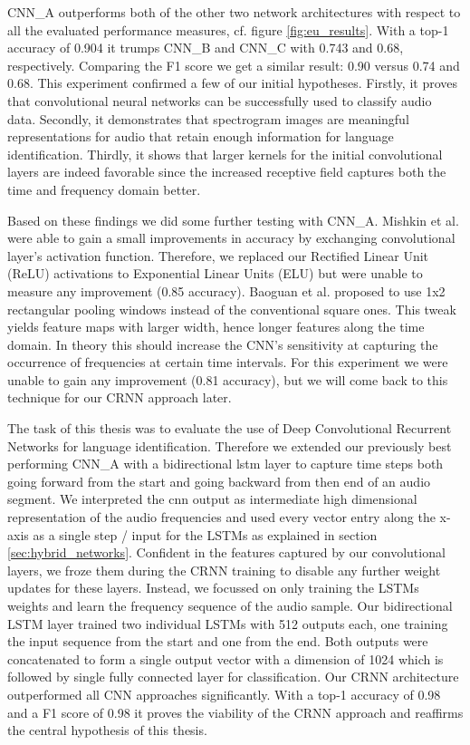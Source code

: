 CNN\_A outperforms both of the other two network architectures with respect to all the evaluated performance measures, cf. figure \ref{fig:eu_results}. With a top-1 accuracy of 0.904 it trumps CNN\_B and CNN\_C with 0.743 and 0.68, respectively. Comparing the F1 score we get a similar result: 0.90 versus 0.74 and 0.68. This experiment confirmed a few of our initial hypotheses. Firstly, it proves that convolutional neural networks can be successfully used to classify audio data. Secondly, it demonstrates that spectrogram images are meaningful representations for audio that retain enough information for language identification. Thirdly, it shows that larger kernels for the initial convolutional layers are indeed favorable since the increased receptive field captures both the time and frequency domain better. 

Based on these findings we did some further testing with CNN\_A. Mishkin et al.\cite{mishkin2016systematic} were able to gain a small improvements in accuracy by exchanging convolutional layer's activation function. Therefore, we replaced our  Rectified Linear Unit (ReLU) activations to Exponential Linear Units\cite{clevert2015fast} (ELU) but were unable to measure any improvement (0.85 accuracy). 
Baoguan et al. \cite{shi2016end} proposed to use 1x2 rectangular pooling windows instead of the conventional square ones. This tweak yields feature maps with larger width, hence longer features along the time domain. In theory this should increase the CNN's sensitivity at capturing the occurrence of frequencies at certain time intervals. For this experiment we were unable to gain any improvement (0.81 accuracy), but we will come back to this technique for our CRNN approach later.

The task of this thesis was to evaluate the use of Deep Convolutional Recurrent Networks for language identification. Therefore we extended our previously best performing CNN\_A with a bidirectional \ac{lstm} layer to capture time steps both going forward from the start and going backward from then end of an audio segment. We interpreted the \ac{cnn} output as intermediate high dimensional representation of the audio frequencies and used every vector entry along the x-axis as a single step / input for the LSTMs as explained in section \ref{sec:hybrid_networks}. Confident in the features captured by our convolutional layers, we froze them during the CRNN training to disable any further weight updates for these layers. Instead, we focussed on only training the LSTMs weights and learn the frequency sequence of the audio sample. Our bidirectional LSTM layer trained two individual LSTMs with 512 outputs each, one training the input sequence from the start and one from the end. Both outputs were concatenated to form a single output vector with a dimension of 1024 which is followed by single fully connected layer for classification.
Our CRNN architecture outperformed all CNN approaches significantly. With a top-1 accuracy of 0.98 and a F1 score of 0.98 it proves the viability of the CRNN approach and reaffirms the central hypothesis of this thesis.


